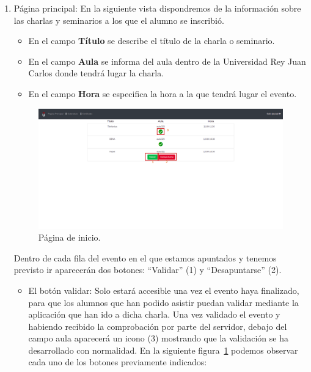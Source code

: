 \documentclass[a4paper, 12pt]{book}
\begin{document}
\begin{enumerate}
  \item Página principal: En la siguiente vista dispondremos de la información sobre las charlas y seminarios a los que el alumno se inscribió.
  \begin{itemize}
\item En el campo \textbf{Título} se describe el título de la charla o seminario.
\item En el campo \textbf{Aula} se informa del aula dentro de la Universidad Rey Juan Carlos donde tendrá lugar la charla.
\item En el campo \textbf{Hora} se especifica la hora a la que tendrá lugar el evento.
\end{itemize}
  
    \begin{figure}[h!]
  	\centering
  	\includegraphics[width=13cm, keepaspectratio]{img/inicio.png}
  	\caption{Página de inicio.}\label{fig:inicio}
	\end{figure}
	
  Dentro de cada fila del evento en el que estamos apuntados y tenemos previsto ir aparecerán dos botones: ``Validar'' (1) y ``Desapuntarse'' (2). 
\begin{itemize}
  \item El botón validar: Solo estará accesible una vez el evento haya finalizado, para que los alumnos que han podido asistir puedan validar mediante la aplicación que han ido a dicha charla. Una vez validado el evento y habiendo recibido la comprobación por parte del servidor, debajo del campo aula aparecerá un icono (3) mostrando que la validación se ha desarrollado con normalidad.
  En la siguiente figura~\ref{fig:inicio} podemos observar cada uno de los botones previamente indicados:



\end{itemize}
\end{enumerate}
\end{document}
